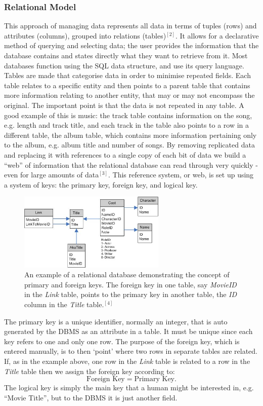 \documentclass[11pt, a4paper]{article}
\begin{document}
\begin{multicols}{2}
\subsubsection{Relational Model}
This approach of managing data represents all data in terms of tuples (rows) and attributes (columns), grouped into relations (tables)$^{[2]}$. It allows for a declarative method of querying and selecting data; the user provides the information that the database contains and states directly what they want to retrieve from it. Most databases function using the SQL data structure, and use its query language. Tables are made that categorise data in order to minimise repeated fields. Each table relates to a specific entity and then points to a parent table that contains more information relating to another entity, that may or may not encompass the original. The important point is that the data is not repeated in any table. A good example of this is music: the track table contains information on the song, e.g. length and track title, and each track in the table also points to a row in a different table, the album table, which contains more information pertaining only to the album, e.g. album title and number of songs. By removing replicated data and replacing it with references to a single copy of each bit of data we build a ``web'' of information that the relational database can read through very quickly  - even for large amounts of data$^{[3]}$. This reference system, or web, is set up using a system of keys: the primary key, foreign key, and logical key. 
\begin{figure}[H]
\includegraphics[width = 7cm]{datastructure_converted}
\caption{\footnotesize An example of a relational database demonstrating the concept of primary and foreign keys. The foreign key in one table, say \textit{MovieID} in the \textit{Link} table, points to the primary key in another table, the \textit{ID} column in the \textit{Title} table.$^{[4]}$}
\centering
\end{figure}
The primary key is a unique identifier, normally an integer, that is auto generated by the DBMS as an attribute in a table. It must be unique since each key refers to one and only one row. The purpose of the foreign key, which is entered manually, is to then `point' where two rows in separate tables are related. If, as in the example above, one row in the \textit{Link} table is related to a row in the \textit{Title} table then we assign the foreign key according to:
\begin{equation*}
\text{Foreign Key} = \text{Primary Key}.
\end{equation*}
The logical key is simply the main key that a human might be interested in, e.g. ``Movie Title'', but to the DBMS it is just another field. 

\end{multicols}
\end{document}
